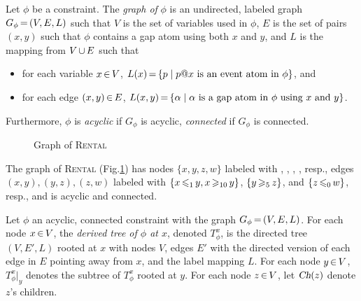 \begin{deff}
  Let $\phi$ be a constraint.
  The {\em graph of} $\phi$ is an undirected, labeled graph
  $G_\phi\,{=}\,(V,E,L)$ such that
  $V$ is the set of variables used in $\phi$,
  $E$ is the set of pairs $(x,y)$ such that $\phi$ contains
  a gap atom using both $x$ and $y$, and
  $L$ is the mapping from $V\,{\cup}\, E$
  such that
  \begin{itemize}
  \item
    for each variable $x\,{\in}\, V$,
    $L(x)\,{=}\,\{p\mid p@x\mbox{ is an event atom in }\phi\}$, and
  \item
    for each edge $(x,y)\,{\in}\, E$,
    $L(x,y)\,{=}\,\{\alpha \mid \alpha
    \mbox{ is a gap atom in $\phi$ using $x$ and $y$}\}$.
  \end{itemize}
  Furthermore, $\phi$ is {\em acyclic}
  if $G_\phi$ is acyclic,
  {\em connected} if $G_\phi$ is connected.
\end{deff}

\begin{figure}[h]\centering
{}
\caption{Graph of \textsc{Rental}}
\label{fig:first-graph}
\end{figure}

\begin{examp}
  The graph of \textsc{Rental} (Fig.\:\ref{fig:first-graph})
  has nodes $\{x,y,z,w\}$
  labeled with \Request, \Schedule, \Compute, \Terminate, resp.,
  edges $(x,y),(y,z),(z,w)$ labeled with
  $\{x\,{\leqslant_1}\, y, x\,{\geqslant_{10}}\, y\}$,
  $\{y\,{\geqslant_5}\, z\}$, and $\{z\,{\leqslant_0}\, w\}$, resp.,
  and is acyclic and connected.
\end{examp}


\begin{deff}
Let $\phi$ an acyclic, connected constraint
with the graph $G_\phi\,{=}\,(V,E,L)$.
For each node $x\,{\in}\, V$, the {\em derived tree of $\phi$ at $x$},
denoted $T_{\phi}^x$, is the directed tree $(V,E',L)$ rooted at $x$
with nodes $V$,
edges $E'$ with the directed version of each edge in $E$
pointing away from $x$,
and the label mapping $L$.
For each node $y\,{\in}\, V$,
$T_\phi^x|_y$ denotes the subtree of $T_\phi^x$ rooted at $y$.  
For each node $z\,{\in}\, V$,
let $\textsl{Ch}(z)$ denote $z$'s children.
\end{deff}
   

